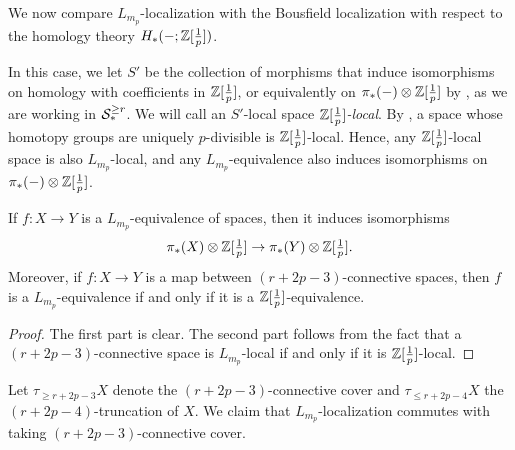 We now compare $L_{m_p}$-localization with
the Bousfield localization with respect to the homology theory $H_{*}(-;{\mathbb{Z}}[\frac{1}{p}])$.

In this case, we let $S'$ be the collection of morphisms that induce isomorphisms on homology with coefficients in ${\mathbb{Z}}[\frac{1}{p}]$, or equivalently on $\pi_*(-)\otimes {\mathbb{Z}}[\frac{1}{p}]$ by \cite[Proposition 4.3]{Bousfield96}, as we are working in ${\mathcal{S}}^{\geq r}_*$.
We will call an $S'$-local space \emph{${\mathbb{Z}}[\frac{1}{p}]$-local}.
By \cite[Theorem 5.5]{Bousfield96}, 
a space whose homotopy groups are uniquely $p$-divisible is ${\mathbb{Z}}[\frac{1}{p}]$-local.
Hence, any ${\mathbb{Z}}[\frac{1}{p}]$-local space is also $L_{m_p}$-local, and any $L_{m_p}$-equivalence also induces isomorphisms on $\pi_*(-)\otimes {\mathbb{Z}}[\frac{1}{p}]$.

\begin{lemma}
\label{L-equivalence implies Z[1/p]-iso in spaces}
	If $f:X\to Y$ is a $L_{m_{p}}$-equivalence of spaces, then it induces isomorphisms
	$$
	\textstyle{\pi_{*}(X)\otimes {\mathbb{Z}}[\frac{1}{p}]
	\to
	\pi_{*}(Y)\otimes {\mathbb{Z}}[\frac{1}{p}]}.
	$$
	Moreover, if $f:X\to Y$ is a map between $(r+2p-3)$-connective spaces, then $f$ is a $L_{m_p}$-equivalence if and only if it is a ${\mathbb{Z}}[\frac{1}{p}]$-equivalence.
\end{lemma}
\begin{proof}
    The first part is clear.
    The second part follows from the fact that a $(r+2p-3)$-connective space is $L_{m_p}$-local if and only if it is ${\mathbb{Z}}[\frac{1}{p}]$-local.
\end{proof}

Let $\tau_{\geq r+2p-3}X$ denote the $(r+2p-3)$-connective cover and $\tau_{\leq r+2p-4}X$ the $(r+2p-4)$-truncation of $X$.
We claim that $L_{m_p}$-localization commutes with taking $(r+2p-3)$-connective cover.

